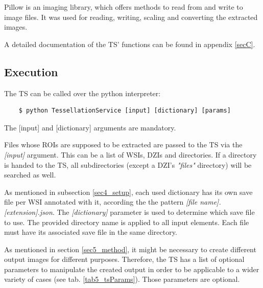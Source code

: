 Pillow is an imaging library, which offers methods to read from and write to image files. It was used for reading, writing, scaling and converting the extracted images.

A detailed documentation of the TS' functions can be found in appendix \ref{secC}.

\subsection{Execution}
\label{sec5_exec}
The TS can be called over the python interpreter:

\begin{lstlisting}
	$ python TessellationService [input] [dictionary] [params]
\end{lstlisting}

The [input] and [dictionary] arguments are mandatory. 

Files whose ROIs are supposed to be extracted are passed to the TS via the \emph{[input]} argument. This can be a list of WSIs, DZIs and directories. If a directory is handed to the TS, all subdirectories (except a DZI's \emph{"{\textunderscore}files"} directory) will be searched as well.

As mentioned in subsection \ref{sec4_setup}, each used dictionary has its own save file per WSI annotated with it, according the the pattern \emph{[file name].[extension]\textunderscore\allowbreak[dictionary].json}. The \emph{[dictionary]} parameter is used to determine which save file to use. The provided directory name is applied to all input elements. Each file must have its associated save file in the same directory.

As mentioned in section \ref{sec5_method}, it might be necessary to create different output images for different purposes. Therefore, the TS has a list of optional parameters to manipulate the created output in order to be applicable to a wider variety of cases (see tab. \ref{tab5_tsParams}). Those parameters are optional. 

